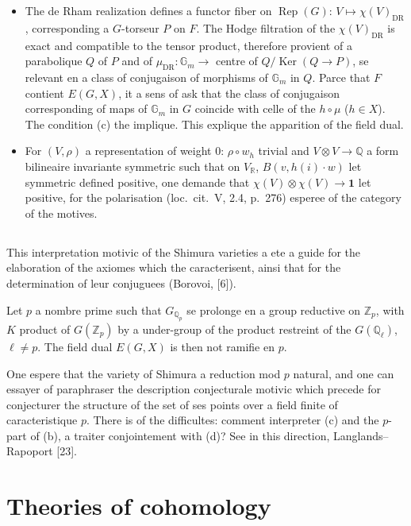 \documentclass[11pt,a4paper]{article}
\theoremstyle{plain}
\theoremstyle{definition}
\DeclareMathOperator{\Ker}{Ker}
\DeclareMathOperator{\Rep}{Rep}
\newcommand{\Q}{\mathbb{Q}}
\newcommand{\Z}{\mathbb{Z}}
\newcommand{\R}{\mathbb{R}}
\DeclareMathOperator{\DR}{DR}
\begin{document}
\begin{itemize}
\item[(d)] The de Rham realization defines a functor fiber on $\Rep(G)$: $V \mapsto \chi(V)_{\DR}$, corresponding a $G$-torseur $P$ on $F$. The Hodge filtration of the $\chi(V)_{\DR}$ is exact and compatible to the tensor product, therefore provient of a parabolique $Q$ of $P$ and of $\mu_{\DR}: \mathbb{G}_m \to$ centre of $Q/\Ker(Q \to P)$, se relevant en a class of conjugaison of morphisms of $\mathbb{G}_m$ in $Q$. Parce that $F$ contient $E(G, X)$, it a sens of ask that the class of conjugaison corresponding of maps of $\mathbb{G}_m$ in $G$ coincide with celle of the $h \circ \mu$ ($h \in X$). The condition (c) the implique. This explique the apparition of the field dual.

\item[(e)] For $(V, \rho)$ a representation of weight $0$: $\rho \circ w_h$ trivial and $V \otimes V \to \Q$ a form bilineaire invariante symmetric such that on $V_{\R}$, $B(v, h(i) \cdot w)$ let symmetric defined positive, one demande that $\chi(V) \otimes \chi(V) \to \mathbf{1}$ let positive, for the polarisation (loc.~cit.~V, 2.4, p.~276) esperee of the category of the motives.
\end{itemize}

\subsection{}

This interpretation motivic of the Shimura varieties a ete a guide for the elaboration of the axiomes which the caracterisent, ainsi that for the determination of leur conjuguees (Borovoi, [6]).

Let $p$ a nombre prime such that $G_{\Q_p}$ se prolonge en a group reductive on $\Z_p$, with $K$ product of $G(\Z_p)$ by a under-group of the product restreint of the $G(\Q_\ell)$, $\ell \neq p$. The field dual $E(G, X)$ is then not ramifie en $p$.

One espere that the variety of Shimura a reduction mod $p$ natural, and one can essayer of paraphraser the description conjecturale motivic which precede for conjecturer the structure of the set of ses points over a field finite of caracteristique $p$. There is of the difficultes: comment interpreter (c) and the $p$-part of (b), a traiter conjointement with (d)? See in this direction, Langlands--Rapoport [23].


\section{Theories of cohomology}
\end{document}
